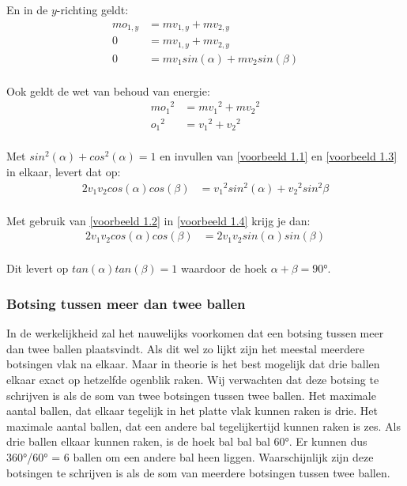 \documentclass[12pt,a4paper]{article}
\begin{document}
	En in de $y$-richting geldt:
	\begin{equation}
	\begin{aligned}
	\label{voorbeeld 1.2}
		mo_{1, y}&=mv_{1, y}+mv_{2, y}\\
		0&=mv_{1, y}+mv_{2, y}\\
		0&=mv_1sin(\alpha)+mv_2sin(\beta)\\
	\end{aligned}
	\end{equation}

	Ook geldt de wet van behoud van energie:
	\begin{equation}
	\begin{aligned}
	\label{voorbeeld 1.3}
		m{o_1}^2&=m{v_1}^2+m{v_2}^2\\
		{o_1}^2&={v_1}^2+{v_2}^2\\
	\end{aligned}
	\end{equation}

	Met $sin^2(\alpha)+cos^2(\alpha)=1$ en invullen van \eqref{voorbeeld 1.1} en \eqref{voorbeeld 1.3} in elkaar, levert dat op:
	\begin{equation}
	\begin{aligned}
	\label{voorbeeld 1.4}
		2v_1v_2cos(\alpha)cos(\beta)&={v_1}^2sin^2(\alpha)+{v_2}^2sin^2{\beta}\\
	\end{aligned}
	\end{equation}

	Met gebruik van \eqref{voorbeeld 1.2} in \eqref{voorbeeld 1.4} krijg je dan:
	\begin{equation}
	\begin{aligned}
	\label{voorbeeld 1.5}
		2v_1v_2cos(\alpha)cos(\beta)&=2v_1v_2sin(\alpha)sin(\beta)\\
	\end{aligned}
	\end{equation}

	Dit levert op $tan(\alpha)tan(\beta)=1$ waardoor de hoek $\alpha+\beta=90°$.

	\subsubsection{Botsing tussen meer dan twee ballen}
	In de werkelijkheid zal het nauwelijks voorkomen dat een botsing tussen meer dan twee ballen plaatsvindt. Als dit wel zo lijkt zijn het meestal meerdere botsingen vlak na elkaar. Maar in theorie is het best mogelijk dat drie ballen elkaar exact op hetzelfde ogenblik raken. Wij verwachten dat deze botsing te schrijven is als de som van twee botsingen tussen twee ballen.
	Het maximale aantal ballen, dat elkaar tegelijk in het platte vlak kunnen raken is drie. Het maximale aantal ballen, dat een andere bal tegelijkertijd kunnen raken is zes. Als drie ballen elkaar kunnen raken, is de hoek bal bal bal 60°. Er kunnen dus 360°/60° = 6 ballen om een andere bal heen liggen. Waarschijnlijk zijn deze botsingen te schrijven is als de som van meerdere botsingen tussen twee ballen.
\end{document}
